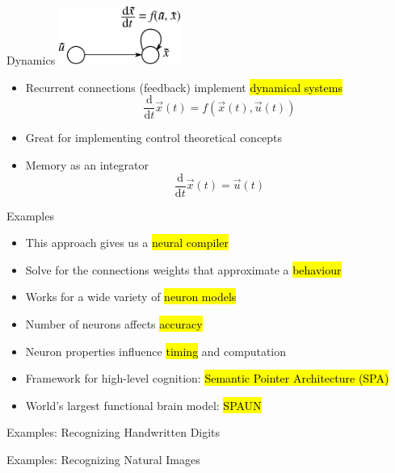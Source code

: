 \documentclass[handout,aspectratio=169]{beamer}
\begin{document}
\begin{frame}{Dynamics}
	\vspace{0.25cm}
	\centering
	\includegraphics[width=0.3\textwidth]{media/network_dynamics.pdf}\\[0.5cm]
	\begin{itemize}
		\setlength{\itemsep}{0.25cm}
		\item Recurrent connections (feedback) implement \hl{dynamical systems}
		$$\frac{\mathrm{d}}{\mathrm{d}t} \vec x(t) = f(\vec x(t), \vec u(t))$$
		\item<2-> Great for implementing control theoretical concepts
		\item<3-> Memory as an integrator $$\frac{\mathrm{d}}{\mathrm{d}t} \vec x(t) = \vec u(t)$$
	\end{itemize}
\end{frame}

\begin{frame}{Examples}
	\begin{itemize}
		\setlength\itemsep{0.25cm}
		\item This approach gives us a \hl{neural compiler}
		\item<2-> Solve for the connections weights that approximate a \hl{behaviour}
		\item<3-> Works for a wide variety of \hl{neuron models}
		\item<4-> Number of neurons affects \hl{accuracy}
		\item<5-> Neuron properties influence \hl{timing} and computation
		\item<6-> Framework for high-level cognition: \hl{Semantic Pointer Architecture (SPA)}
		\item<7-> World's largest functional brain model: \hl{SPAUN}
	\end{itemize}
\end{frame}

\begin{frame}{Examples: Recognizing Handwritten Digits}
	\centering
\end{frame}

\begin{frame}{Examples: Recognizing Natural Images}
	\centering
\end{frame}
\end{document}

